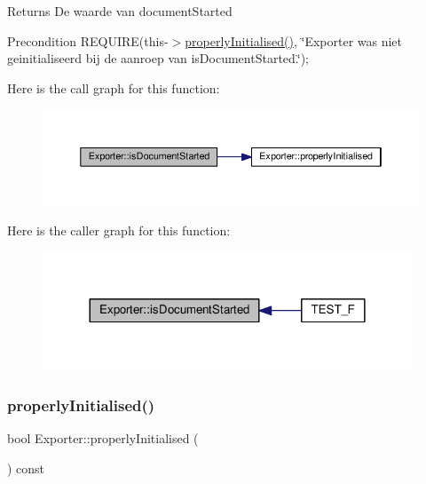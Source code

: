 \begin{DoxyReturn}{Returns}
De waarde van document\+Started 
\end{DoxyReturn}
\begin{DoxyPrecond}{Precondition}
R\+E\+Q\+U\+I\+RE(this-\/$>$\hyperlink{class_exporter_aafd9df9210aeefd7bb7fd434fc317cf0}{properly\+Initialised()}, \char`\"{}\+Exporter was niet geinitialiseerd bij de aanroep van is\+Document\+Started.\char`\"{}); 
\end{DoxyPrecond}
Here is the call graph for this function\+:\nopagebreak
\begin{figure}[H]
\begin{center}
\leavevmode
\includegraphics[width=350pt]{class_exporter_a3ef5b88b982577090f4960fabae518c1_cgraph}
\end{center}
\end{figure}
Here is the caller graph for this function\+:\nopagebreak
\begin{figure}[H]
\begin{center}
\leavevmode
\includegraphics[width=312pt]{class_exporter_a3ef5b88b982577090f4960fabae518c1_icgraph}
\end{center}
\end{figure}
\mbox{\label{class_exporter_aafd9df9210aeefd7bb7fd434fc317cf0}} 
\subsubsection{\texorpdfstring{properly\+Initialised()}{properlyInitialised()}}
{\footnotesize\ttfamily bool Exporter\+::properly\+Initialised (\begin{DoxyParamCaption}{ }\end{DoxyParamCaption}) const\hspace{0.3cm}{\ttfamily [virtual]}}



